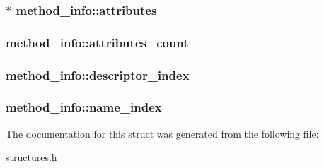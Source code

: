 \subsubsection[{\texorpdfstring{attributes}{attributes}}]{$\ast$ method\+\_\+info\+::attributes}\hypertarget{structmethod__info_a8ce4caaa03680c91f548558a38647ad8}{}\label{structmethod__info_a8ce4caaa03680c91f548558a38647ad8}
\subsubsection[{\texorpdfstring{attributes\+\_\+count}{attributes_count}}]{ method\+\_\+info\+::attributes\+\_\+count}\hypertarget{structmethod__info_ad9e5e1e2fc850806addadd6deab8565d}{}\label{structmethod__info_ad9e5e1e2fc850806addadd6deab8565d}
\subsubsection[{\texorpdfstring{descriptor\+\_\+index}{descriptor_index}}]{ method\+\_\+info\+::descriptor\+\_\+index}\hypertarget{structmethod__info_a7713103e0c8d060630ad62774fb9be37}{}\label{structmethod__info_a7713103e0c8d060630ad62774fb9be37}
\subsubsection[{\texorpdfstring{name\+\_\+index}{name_index}}]{ method\+\_\+info\+::name\+\_\+index}\hypertarget{structmethod__info_ab91d62d0658b77bba83f6bb685e3bbb9}{}\label{structmethod__info_ab91d62d0658b77bba83f6bb685e3bbb9}


The documentation for this struct was generated from the following file\+:\begin{DoxyCompactItemize}
\item 
\hyperlink{structures_8h}{structures.\+h}\end{DoxyCompactItemize}
